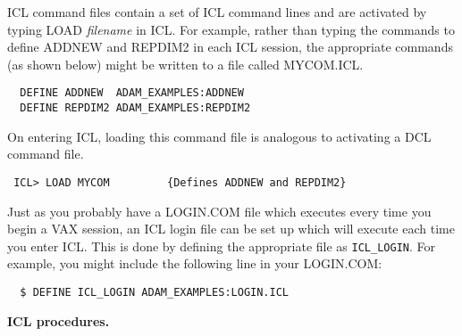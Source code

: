 ICL command files contain a set of ICL command lines
and are activated by typing LOAD {\sl filename} in ICL.
For example, rather than typing the commands to define ADDNEW and REPDIM2 
in each ICL session, the appropriate commands (as shown below) might be 
written to  a file called MYCOM.ICL.
\begin{verbatim}
  DEFINE ADDNEW  ADAM_EXAMPLES:ADDNEW
  DEFINE REPDIM2 ADAM_EXAMPLES:REPDIM2
\end{verbatim}
On entering ICL, loading this command file is analogous to activating a DCL
command file.
\begin{verbatim}
 ICL> LOAD MYCOM         {Defines ADDNEW and REPDIM2}
\end{verbatim}
Just as you probably have a  LOGIN.COM file which  executes every time
you begin a VAX session,
an ICL login file can be set up which will execute each time 
you enter ICL.
This is done by defining the appropriate file as {\tt ICL\_LOGIN}.
For example, you might include the following line in your LOGIN.COM:
\begin{verbatim}
  $ DEFINE ICL_LOGIN ADAM_EXAMPLES:LOGIN.ICL
\end{verbatim}


{\large\bf ICL procedures.}

